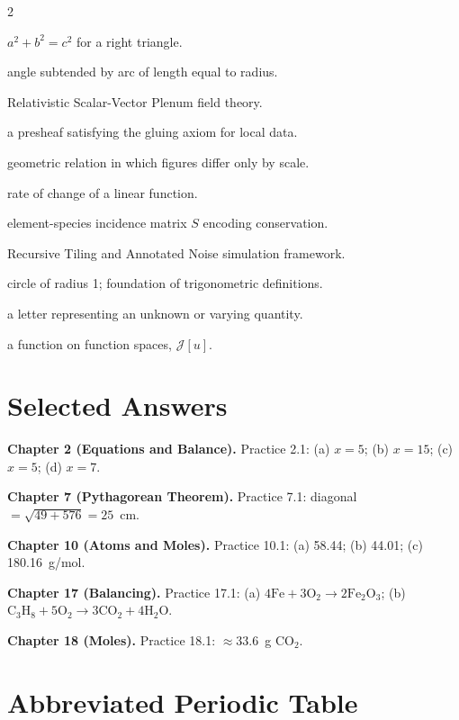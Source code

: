 \documentclass[11pt, openany]{book}
\theoremstyle{plain}
\theoremstyle{definition}
\theoremstyle{remark}
\begin{document}
\begin{multicols}{2}
\begin{description}[labelindent=0pt,leftmargin=0.8em,style=nextline]
\item[Pythagorean theorem] $a^2+b^2=c^2$ for a right triangle.
\item[Radian] angle subtended by arc of length equal to radius.
\item[RSVP] Relativistic Scalar-Vector Plenum field theory.
\item[Sheaf] a presheaf satisfying the gluing axiom for local data.
\item[Similarity] geometric relation in which figures differ only by scale.
\item[Slope] rate of change of a linear function.
\item[Stoichiometric matrix] element-species incidence matrix $S$ encoding conservation.
\item[TARTAN] Recursive Tiling and Annotated Noise simulation framework.
\item[Unit circle] circle of radius 1; foundation of trigonometric definitions.
\item[Variable] a letter representing an unknown or varying quantity.
\item[Variational functional] a function on function spaces, $\mathcal{J}[u]$.
\end{description}
\end{multicols}

\chapter*{Selected Answers}

\textbf{Chapter 2 (Equations and Balance).}
Practice 2.1: (a) $x=5$; (b) $x=15$; (c) $x=5$; (d) $x=7$.

\textbf{Chapter 7 (Pythagorean Theorem).}
Practice 7.1: diagonal $=\sqrt{49+576}=25$~cm.

\textbf{Chapter 10 (Atoms and Moles).}
Practice 10.1: (a) 58.44; (b) 44.01; (c) 180.16~g/mol.

\textbf{Chapter 17 (Balancing).}
Practice 17.1: (a) $4\mathrm{Fe}+3\mathrm{O_2}\to2\mathrm{Fe_2O_3}$;
(b) $\mathrm{C_3H_8}+5\mathrm{O_2}\to3\mathrm{CO_2}+4\mathrm{H_2O}$.

\textbf{Chapter 18 (Moles).}
Practice 18.1: $\approx33.6$~g CO$_2$.

\chapter*{Abbreviated Periodic Table}
\end{document}
